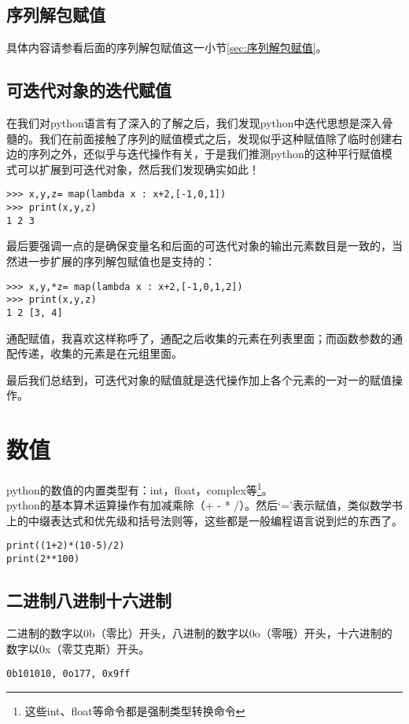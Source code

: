\documentclass[12pt,oneside]{book}
\begin{document}
\begin{common-format}
\subsection{序列解包赋值}
具体内容请参看后面的序列解包赋值这一小节\ref{sec:序列解包赋值}。

\subsection{可迭代对象的迭代赋值}
在我们对python语言有了深入的了解之后，我们发现python中迭代思想是深入骨髓的。我们在前面接触了序列的赋值模式之后，发现似乎这种赋值除了临时创建右边的序列之外，还似乎与迭代操作有关，于是我们推测python的这种平行赋值模式可以扩展到可迭代对象，然后我们发现确实如此！
\begin{Verbatim}
>>> x,y,z= map(lambda x : x+2,[-1,0,1])
>>> print(x,y,z)
1 2 3
\end{Verbatim}

最后要强调一点的是确保变量名和后面的可迭代对象的输出元素数目是一致的，当然进一步扩展的序列解包赋值也是支持的：
\begin{Verbatim}
>>> x,y,*z= map(lambda x : x+2,[-1,0,1,2])
>>> print(x,y,z)
1 2 [3, 4]
\end{Verbatim}
通配赋值，我喜欢这样称呼了，通配之后收集的元素在列表里面；而函数参数的通配传递，收集的元素是在元组里面。

最后我们总结到，可迭代对象的赋值就是迭代操作加上各个元素的一对一的赋值操作。


\section{数值}
python的数值的内置类型有：int，float，complex等\footnote{这些int、float等命令都是强制类型转换命令}。\\python的基本算术运算操作有加减乘除（+ - * /）。然后‘=’表示赋值，类似数学书上的中缀表达式和优先级和括号法则等，这些都是一般编程语言说到烂的东西了。

\begin{Verbatim}
print((1+2)*(10-5)/2)
print(2**100)
\end{Verbatim}


\subsection{二进制八进制十六进制}
二进制的数字以0b（零比）开头，八进制的数字以0o（零哦）开头，十六进制的数字以0x（零艾克斯）开头。
\begin{Verbatim}
0b101010, 0o177, 0x9ff
\end{Verbatim}


\end{common-format}
\end{document}
